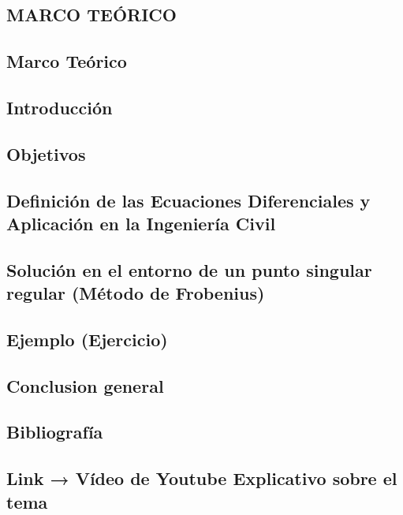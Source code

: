 \documentclass{article}
\begin{document}
\begin{center}
\section{MARCO TEÓRICO}
\end{center}
\vspace{0.5cm}
\subsection{Marco Teórico}
\vspace{0.5cm}
\subsection{Introducción}
\vspace{0.5cm}
\subsection{Objetivos}
\vspace{0.5cm}
\subsection{Definición de las Ecuaciones Diferenciales y Aplicación en la Ingeniería Civil}
\vspace{0.5cm}
\subsection{Solución en el entorno de un punto singular regular (Método de Frobenius)}
\vspace{0.5cm}
\subsection{Ejemplo (Ejercicio)}
\vspace{0.5cm}
\subsection{Conclusion general}
\vspace{0.5cm}
\subsection{Bibliografía}
\vspace{0.5cm}
\subsection{Link → Vídeo de Youtube Explicativo sobre el tema}
\vspace{1cm}
\end{document}
